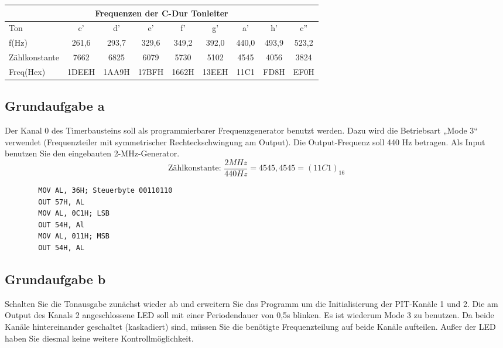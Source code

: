 \documentclass[a4paper,12pt,titlepage]{scrartcl}
\begin{document}
\begin{center}
    \begin{tabular}{| l | c | c | c | c | c | c | c | c | }
            \hline
            \multicolumn{9}{|c|}{Frequenzen der C-Dur Tonleiter}\\
            \hline
            \hline
            Ton   & c'    & d'    & e'    & f'    & g'    & a'    & h'    & c''   \\\hline
            f(Hz) & 261,6 & 293,7 & 329,6 & 349,2 & 392,0 & 440,0 & 493,9 & 523,2 \\\hline
            Zählkonstante & 7662 & 6825 & 6079 & 5730 & 5102 & 4545 & 4056 & 3824 \\\hline
            Freq(Hex) & 1DEEH & 1AA9H & 17BFH & 1662H & 13EEH & 11C1 & FD8H & EF0H\\\hline
    \end{tabular}
\end{center}

\subsection*{Grundaufgabe a}
Der  Kanal  0  des  Timerbausteins  soll  als  programmierbarer  Frequenzgenerator  benutzt  werden.  Dazu  wird  die  Betriebsart  „Mode  3“  verwendet  (Frequenzteiler  mit  symmetrischer  Rechteckschwingung  am  Output).  Die  Output-Frequenz  soll  440  Hz  betragen. Als Input benutzen Sie den eingebauten 2-MHz-Generator.
$$\text{Zählkonstante: } \frac{2 MHz}{440 Hz} = 4545,4545 = (11C1)_{16}$$

\begin{lstlisting}
        MOV AL, 36H; Steuerbyte 00110110
        OUT 57H, AL
        MOV AL, 0C1H; LSB
        OUT 54H, Al
        MOV AL, 011H; MSB
        OUT 54H, AL
\end{lstlisting}

\subsection*{Grundaufgabe b}
Schalten  Sie  die  Tonausgabe  zunächst  wieder  ab  und  erweitern  Sie  das  Programm  um  die  Initialisierung der PIT-Kanäle 1 und 2. Die am Output des Kanals 2 angeschlossene LED soll mit  einer  Periodendauer  von  0,5s  blinken.  Es  ist  wiederum  Mode  3  zu  benutzen.  Da  beide  Kanäle hintereinander geschaltet (kaskadiert) sind, müssen Sie die benötigte Frequenzteilung auf beide Kanäle aufteilen. Außer der LED haben Sie diesmal keine weitere Kontrollmöglichkeit.
\end{document}

